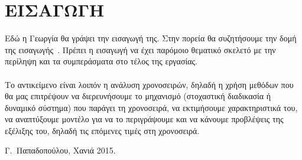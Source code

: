 \chapter*{ΕΙΣΑΓΩΓΗ}

Εδώ η Γεωργία θα γράψει την εισαγωγή της. Στην πορεία θα συζητήσουμε
την δομή της εισαγωγής~\cite{Kourounis2014}. 
Πρέπει η εισαγωγή να έχει παρόμοιο θεματικό σκελετό με την~\cite{Jansen:book,Chen:2012} 
περίληψη και τα συμπεράσματα στο τέλος της εργασίας.\\ \\
Το αντικείμενο είναι λοιπόν η ανάλυση χρονοσειρών,
δηλαδή η χρήση μεθόδων που θα μας επιτρέψουν να διερευνήσουμε το μηχανισμό
(στοχαστική διαδικασία ή δυναμικό σύστημα) που παράγει τη χρονοσειρά, να
εκτιμήσουμε χαρακτηριστικά του, να αναπτύξουμε μοντέλο για να το περιγράψουμε
και να κάνουμε προβλέψεις της εξέλιξης του, δηλαδή τις επόμενες τιμές στη
χρονοσειρά.




\bigskip

\begin{flushright}
\begin{minipage}{150pt}
Γ.\ Παπαδοπούλου, Χανιά 2015.
\end{minipage}
\end{flushright}



\endinput
